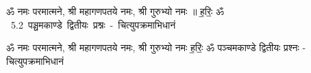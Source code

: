 \documentclass[17pt]{extarticle}
\begin{document}
\begin{titlepage}
    \begin{center}
 
\begin{sanskrit}
    { \Large
    ॐ नमः परमात्मने, श्री महागणपतये नमः, श्री गुरुभ्यो नमः ॥ ह॒रिः॒ ॐ 
    }
    \\
    \vspace{2.5cm}
    \mbox{ \Huge
    5.2      पञ्चमकाण्डे द्वितीयः प्रश्नः - चित्युपक्रमाभिधानं   }
\end{sanskrit}
\end{center}

\end{titlepage}
\tableofcontents

ॐ नमः परमात्मने, श्री महागणपतये नमः, श्री गुरुभ्यो नमः
ह॒रिः॒ ॐ       पञ्चमकाण्डे द्वितीयः प्रश्नः - चित्युपक्रमाभिधानं \newline

\end{document}
